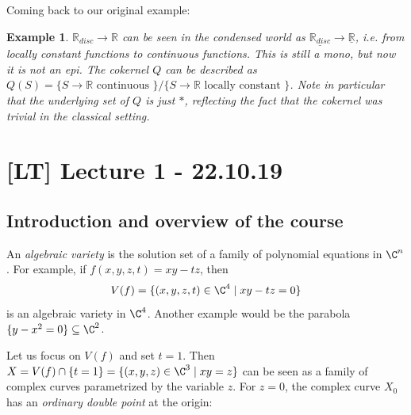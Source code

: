 \documentclass[A4paper, british]{amsart}
\theoremstyle{darkgreentheorem}
\theoremstyle{darkbluedefinition}
\theoremstyle{darkredexample}
\newtheorem{exa}[thm]{Example}
\theoremstyle{remark}
\newcommand{\1}{\mathbbm{1}}
\renewcommand{\u}[1]{\underline{#1}}
\begin{document}
Coming back to our original example:

\begin{exa}
    $\mathbb{R}_{disc}\to \mathbb{R}$ can be seen in the condensed world as $\u{\mathbb{R}_{disc}}\to \u{\mathbb{R}}$, i.e. from locally constant functions to continuous functions.
    This is still a mono, but now it is not an epi.
    The cokernel $Q$ can be described as $Q(S)=\{ S\to \mathbb{R}\text{ continuous }\}/\{ S\to \mathbb{R}\text{ locally constant }\}$.
    Note in particular that the underlying set of $Q$ is just $*$, reflecting the fact that the cokernel was trivial in the classical setting.
\end{exa}

\section{[LT] Lecture 1 - 22.10.19}

\subsection{Introduction and overview of the course}

An \textit{algebraic variety} is the solution set of a family of polynomial equations in $\C^{n}$.
For example, if $f(x,y,z,t)=xy-tz$, then
\[ V(f)=\{(x,y,z,t)\in \C^{4}\mid xy-tz=0\} \]
is an algebraic variety in $\C^{4}$.
Another example would be the parabola $\{ y-x^{2}=0\}\subseteq \C^{2}$.

Let us focus on $V(f)$ and set $t=1$.
Then $X=V(f)\cap \{ t=1 \}=\{(x,y,z)\in \C^{3}\mid xy=z\}$ can be seen as a family of complex curves parametrized by the variable $z$.
For $z=0$, the complex curve $X_{0}$ has an \textit{ordinary double point} at the origin:
\end{document}
